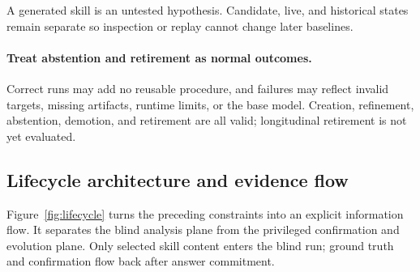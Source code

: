 \documentclass[11pt]{article}
\begin{document}
A generated skill is an untested hypothesis.  Candidate, live, and historical states
remain separate so inspection or replay cannot change later baselines.

\paragraph{Treat abstention and retirement as normal outcomes.}

Correct runs may add no reusable procedure, and failures may reflect invalid targets,
missing artifacts, runtime limits, or the base model.  Creation, refinement, abstention,
demotion, and retirement are all valid; longitudinal retirement is not yet evaluated.

\subsection{Lifecycle architecture and evidence flow}
\label{sec:framework}

Figure~\ref{fig:lifecycle} turns the preceding constraints into an explicit information
flow.  It separates the blind analysis plane from the privileged confirmation and
evolution plane.  Only selected skill content enters the blind run; ground truth and
confirmation flow back after answer commitment.
\end{document}
